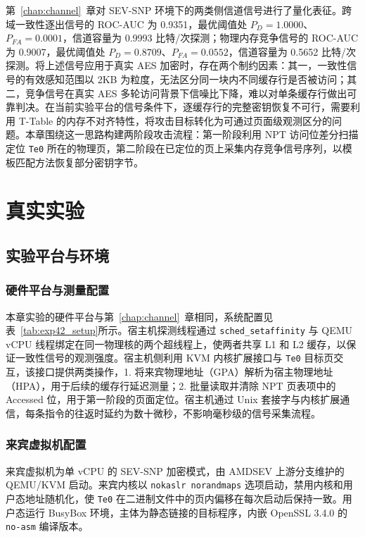 第~\ref{chap:channel}~章对 SEV-SNP 环境下的两类侧信道信号进行了量化表征。跨域一致性逐出信号的 ROC-AUC 为 0.9351，最优阈值处 $P_D = 1.0000$、$P_{FA} = 0.0001$，信道容量为 0.9993 比特/次探测；物理内存竞争信号的 ROC-AUC 为 0.9007，最优阈值处 $P_D = 0.8709$、$P_{FA} = 0.0552$，信道容量为 0.5652 比特/次探测。将上述信号应用于真实 AES 加密时，存在两个制约因素：其一，一致性信号的有效感知范围以 2KB 为粒度，无法区分同一块内不同缓存行是否被访问；其二，竞争信号在真实 AES 多轮访问背景下信噪比下降，难以对单条缓存行做出可靠判决。在当前实验平台的信号条件下，逐缓存行的完整密钥恢复不可行，需要利用 T-Table 的内存不对齐特性，将攻击目标转化为可通过页面级观测区分的问题。本章围绕这一思路构建两阶段攻击流程：第一阶段利用 NPT 访问位差分扫描定位 \texttt{Te0} 所在的物理页，第二阶段在已定位的页上采集内存竞争信号序列，以模板匹配方法恢复部分密钥字节。

\section{真实实验}
\label{sec:real_exp}

\subsection{实验平台与环境}
\label{subsec:exp_platform}

\subsubsection{硬件平台与测量配置}

本章实验的硬件平台与第~\ref{chap:channel}~章相同，系统配置见表~\ref{tab:exp42_setup}所示。宿主机探测线程通过 \texttt{sched\_setaffinity} 与 QEMU vCPU 线程绑定在同一物理核的两个超线程上，使两者共享 L1 和 L2 缓存，以保证一致性信号的观测强度。宿主机侧利用 KVM 内核扩展接口与 \texttt{Te0} 目标页交互，该接口提供两类操作，1. 将来宾物理地址（GPA）解析为宿主物理地址（HPA），用于后续的缓存行延迟测量；2. 批量读取并清除 NPT 页表项中的 Accessed 位，用于第一阶段的页面定位。宿主机通过 Unix 套接字与内核扩展通信，每条指令的往返时延约为数十微秒，不影响毫秒级的信号采集流程。

\subsubsection{来宾虚拟机配置}

来宾虚拟机为单 vCPU 的 SEV-SNP 加密模式，由 AMDSEV 上游分支维护的 QEMU/KVM 启动。来宾内核以 \texttt{nokaslr norandmaps} 选项启动，禁用内核和用户态地址随机化，使 \texttt{Te0} 在二进制文件中的页内偏移在每次启动后保持一致。用户态运行 BusyBox 环境，主体为静态链接的目标程序，内嵌 OpenSSL 3.4.0 的 \texttt{no-asm} 编译版本。

